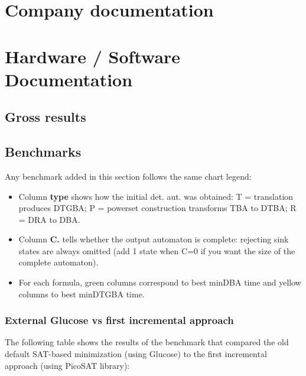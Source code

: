 \chapter{Company documentation}
\chapter{Hardware / Software Documentation}

\begin{landscape}
\chapter{Gross results}

\section{Benchmarks}
Any benchmark added in this section follows the same chart legend:\\
\begin{itemize}
 \item Column \textbf{type} shows how the initial det. aut. was obtained: T = translation produces DTGBA;
       P = powerset construction transforms TBA to DTBA; R = DRA to DBA.
 \item Column \textbf{C.} tells whether the output automaton is complete: rejecting sink states are always
       omitted (add 1 state when C=0 if you want the size of the complete automaton).
 \item For each formula, green columns correspond to best minDBA time and yellow columns to best minDTGBA
       time.
\end{itemize}

\subsection{External Glucose vs first incremental approach}
\label{glu_vs_incr1_complete}
The following table shows the results of the benchmark that compared the old default SAT-based minimization
(using Glucose) to the first incremental approach (using PicoSAT library):\\

\end{landscape}